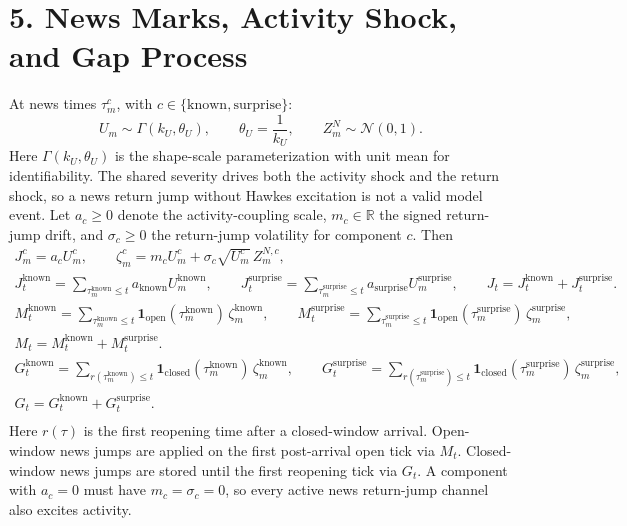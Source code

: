 \documentclass[11pt]{article}
\begin{document}
    \section*{5. News Marks, Activity Shock, and Gap Process}
    At news times \(\tau_m^{c}\), with \(c\in\{\mathrm{known},\mathrm{surprise}\}\):
    \[
        U_m\sim\Gamma(k_U,\theta_U),\qquad
        \theta_U=\frac{1}{k_U},\qquad
        Z_m^N\sim\mathcal N(0,1).
    \]
    Here \(\Gamma(k_U,\theta_U)\) is the shape-scale parameterization with
    unit mean for identifiability.
    The shared severity drives both the activity
    shock and the return shock, so a news return jump without Hawkes excitation
    is not a valid model event.
    Let \(a_c\ge0\) denote the activity-coupling scale, \(m_c\in\mathbb R\) the
    signed return-jump drift, and \(\sigma_c\ge0\) the return-jump volatility
    for component \(c\).
    Then
    \begin{gather*}
        J_m^c=a_c U_m^c,\qquad
        \zeta_m^{c}=m_c U_m^c+\sigma_c\sqrt{U_m^{c}}\,Z_m^{N,c},\\
        J_t^{\mathrm{known}}=\sum_{\tau_m^{\mathrm{known}}\le t} a_{\mathrm{known}}U_m^{\mathrm{known}},
        \qquad
        J_t^{\mathrm{surprise}}=\sum_{\tau_m^{\mathrm{surprise}}\le t} a_{\mathrm{surprise}}U_m^{\mathrm{surprise}},
        \qquad
        J_t=J_t^{\mathrm{known}}+J_t^{\mathrm{surprise}}.\\
        M_t^{\mathrm{known}}=\sum_{\tau_m^{\mathrm{known}}\le t}\mathbf{1}_{\mathrm{open}}(\tau_m^{\mathrm{known}})\,\zeta_m^{\mathrm{known}},
        \qquad
        M_t^{\mathrm{surprise}}=\sum_{\tau_m^{\mathrm{surprise}}\le t}\mathbf{1}_{\mathrm{open}}(\tau_m^{\mathrm{surprise}})\,\zeta_m^{\mathrm{surprise}},\\
        M_t=M_t^{\mathrm{known}}+M_t^{\mathrm{surprise}}.\\
        G_t^{\mathrm{known}}=\sum_{r(\tau_m^{\mathrm{known}})\le t}\mathbf{1}_{\mathrm{closed}}(\tau_m^{\mathrm{known}})\,\zeta_m^{\mathrm{known}},
        \qquad
        G_t^{\mathrm{surprise}}=\sum_{r(\tau_m^{\mathrm{surprise}})\le t}\mathbf{1}_{\mathrm{closed}}(\tau_m^{\mathrm{surprise}})\,\zeta_m^{\mathrm{surprise}},\\
        G_t=G_t^{\mathrm{known}}+G_t^{\mathrm{surprise}}.\\
    \end{gather*}
    Here \(r(\tau)\) is the first reopening time after a closed-window arrival.
    Open-window news jumps are applied on the first post-arrival open tick via \(M_t\).
    Closed-window news jumps are stored until the first reopening tick via \(G_t\).
    A component with \(a_c=0\) must have \(m_c=\sigma_c=0\), so every active
    news return-jump channel also excites activity.
\end{document}
